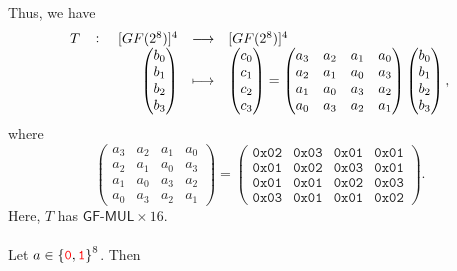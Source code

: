 \noindent Thus, we have \[
\fullfunction{T}{[GF(2^8)]^4}{[GF(2^8)]^4}{\begin{pmatrix}
	b_0 \\ b_1 \\ b_2 \\ b_3
\end{pmatrix}}{\begin{pmatrix}
	c_0 \\ c_1 \\ c_2 \\ c_3
\end{pmatrix}=\begin{pmatrix}
a_3 & a_2 & a_1 & a_0 \\
a_2 & a_1 & a_0 & a_3 \\
a_1 & a_0 & a_3 & a_2 \\
a_0 & a_3 & a_2 & a_1
\end{pmatrix}\begin{pmatrix}
b_0 \\ b_1 \\ b_2 \\ b_3
\end{pmatrix},}
\] where \[
\begin{pmatrix}
	a_3 & a_2 & a_1 & a_0 \\
	a_2 & a_1 & a_0 & a_3 \\
	a_1 & a_0 & a_3 & a_2 \\
	a_0 & a_3 & a_2 & a_1
\end{pmatrix} = \begin{pmatrix}
\texttt{0x02} & \texttt{0x03} & \texttt{0x01} & \texttt{0x01}\\
\texttt{0x01} & \texttt{0x02} & \texttt{0x03} & \texttt{0x01}\\
\texttt{0x01} & \texttt{0x01} & \texttt{0x02} & \texttt{0x03}\\
\texttt{0x03} & \texttt{0x01} & \texttt{0x01} & \texttt{0x02}
\end{pmatrix}.
\] Here, $T$ has $\textsf{GF-MUL}\times 16$.\\
\ \\
\noindent Let $a\in\set{\textcolor{red}{\texttt{0}},\textcolor{red}{\texttt{1}}}^8$. Then

